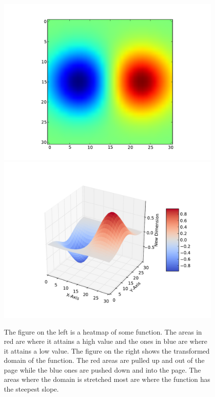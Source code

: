 \begin{figure}[!htb]
    \includegraphics[width=\linewidth]{figs/bumps.pdf}
  \endminipage\hfill
    \includegraphics[width=\linewidth]{figs/tfbumps.pdf}
  \endminipage
\caption[Dimension-Adding WIT example]
{The figure on the left is a heatmap of some function.
The areas in red are where it attains a high value and the ones in blue
are where it attains a low value.
The figure on the right shows the transformed domain of the function.
The red areas are pulled up and out of the page while the blue ones are pushed
down and into the page. The areas where the domain is stretched most are
where the function has the steepest slope.}
\end{figure}

